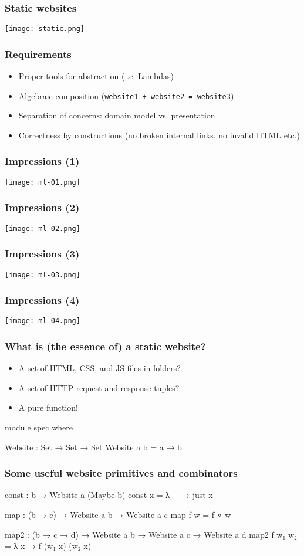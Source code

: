\documentclass[aspectratio=169]{beamer}
\begin{document}
\begin{frame}
\frametitle{Static websites}
\texttt{[image: static.png]}
\end{frame}

\begin{frame}
\frametitle{Requirements}
\begin{itemize}
  \item Proper tools for abstraction (i.e. Lambdas)
  \item Algebraic composition (\texttt{website1 + website2 = website3})
  \item Separation of concerns: domain model vs. presentation
  \item Correctness by constructions (no broken internal links, no invalid HTML etc.)
\end{itemize}
\end{frame}

\begin{frame}
\frametitle{Impressions (1)}
\texttt{[image: ml-01.png]}
\end{frame}

\begin{frame}
\frametitle{Impressions (2)}
\texttt{[image: ml-02.png]}
\end{frame}

\begin{frame}
\frametitle{Impressions (3)}
\texttt{[image: ml-03.png]}
\end{frame}

\begin{frame}
\frametitle{Impressions (4)}
\texttt{[image: ml-04.png]}
\end{frame}

\begin{frame}
\frametitle{What is (the essence of) a static website?}
\begin{itemize}
  \item A set of HTML, CSS, and JS files in folders?
  \item A set of HTTP request and response tuples?
  \item A pure function!
\end{itemize}
\begin{code}
module spec where

  Website : Set → Set → Set
  Website a b = a → b
\end{code}
\end{frame}

\begin{frame}
\frametitle{Some useful website primitives and combinators}
\begin{code}
  const : b → Website a (Maybe b)
  const x = λ _ → just x
  
  map : (b → c) → Website a b → Website a c
  map f w = f ∘ w
  
  map2 : (b → c → d) → Website a b → Website a c → Website a d
  map2 f w₁ w₂ = λ x → f (w₁ x) (w₂ x)
\end{code}
\end{frame}
\end{document}
